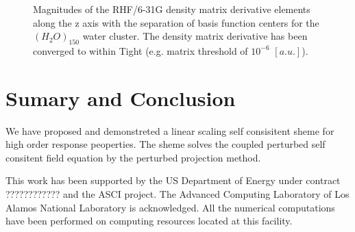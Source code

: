 \documentclass[twocolumn,showpacs,preprintnumbers,amsmath,amssymb]{revtex4}
\begin{document}
\begin{figure}[t]
  \caption{\protect
    Magnitudes of the RHF/6-31G density matrix derivative elements 
    along the z axis with the separation of basis function centers
    for the $(H_2O)_{150}$ water cluster. The density matrix 
    derivative has been converged to within Tight (e.g. 
    matrix threshold of $10^{-6}$ $[a.u.]$).
  }\label{fig:Alpha_Decay}
\end{figure}






\section{Sumary and Conclusion}


 We have proposed and demonstreted a linear scaling self
 consisitent sheme for high order response peoperties.
 The sheme solves the coupled perturbed self consitent field 
 equation by the perturbed projection method.



\begin{acknowledgments}
 This work has been supported by the US Department of Energy 
 under contract ???????????? and the ASCI project.  
 The Advanced Computing Laboratory of Los 
 Alamos National Laboratory is acknowledged.
 All the numerical computations have been
 performed on computing resources located at this facility.
\end{acknowledgments}

\end{document}
